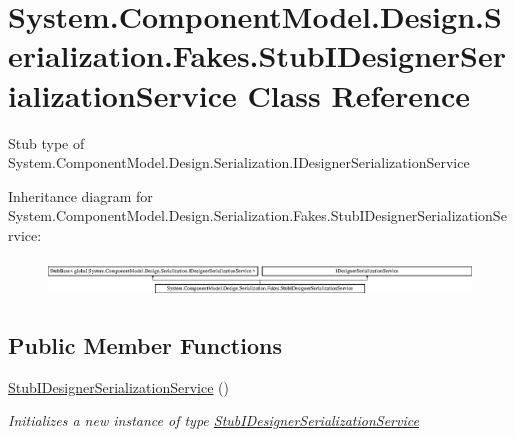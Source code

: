 \hypertarget{class_system_1_1_component_model_1_1_design_1_1_serialization_1_1_fakes_1_1_stub_i_designer_serialization_service}{\section{System.\-Component\-Model.\-Design.\-Serialization.\-Fakes.\-Stub\-I\-Designer\-Serialization\-Service Class Reference}
\label{class_system_1_1_component_model_1_1_design_1_1_serialization_1_1_fakes_1_1_stub_i_designer_serialization_service}
}


Stub type of System.\-Component\-Model.\-Design.\-Serialization.\-I\-Designer\-Serialization\-Service 


Inheritance diagram for System.\-Component\-Model.\-Design.\-Serialization.\-Fakes.\-Stub\-I\-Designer\-Serialization\-Service\-:\begin{figure}[H]
\begin{center}
\leavevmode
\includegraphics[height=0.992908cm]{class_system_1_1_component_model_1_1_design_1_1_serialization_1_1_fakes_1_1_stub_i_designer_serialization_service}
\end{center}
\end{figure}
\subsection*{Public Member Functions}
\begin{DoxyCompactItemize}
\item 
\hyperlink{class_system_1_1_component_model_1_1_design_1_1_serialization_1_1_fakes_1_1_stub_i_designer_serialization_service_a82a8e7cc16e8e07249e83b22e872bbce}{Stub\-I\-Designer\-Serialization\-Service} ()
\begin{DoxyCompactList}\small\item\em Initializes a new instance of type \hyperlink{class_system_1_1_component_model_1_1_design_1_1_serialization_1_1_fakes_1_1_stub_i_designer_serialization_service}{Stub\-I\-Designer\-Serialization\-Service}\end{DoxyCompactList}\end{DoxyCompactItemize}
